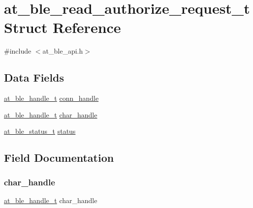 \hypertarget{structat__ble__read__authorize__request__t}{}\section{at\+\_\+ble\+\_\+read\+\_\+authorize\+\_\+request\+\_\+t Struct Reference}
\label{structat__ble__read__authorize__request__t}


{\ttfamily \#include $<$at\+\_\+ble\+\_\+api.\+h$>$}

\subsection*{Data Fields}
\begin{DoxyCompactItemize}
\item 
\mbox{\hyperlink{at__ble__api_8h_abd23646d0c662860741f787efc8456f2}{at\+\_\+ble\+\_\+handle\+\_\+t}} \mbox{\hyperlink{structat__ble__read__authorize__request__t_ae42df6fd8493f8f8faeccfdd6062e96f}{conn\+\_\+handle}}
\item 
\mbox{\hyperlink{at__ble__api_8h_abd23646d0c662860741f787efc8456f2}{at\+\_\+ble\+\_\+handle\+\_\+t}} \mbox{\hyperlink{structat__ble__read__authorize__request__t_abf2dd98b1df5d9471f3e18780eb5e5a7}{char\+\_\+handle}}
\item 
\mbox{\hyperlink{group__error__codes__group_ga3b1db9b95feb157b3c188ca27fe76988}{at\+\_\+ble\+\_\+status\+\_\+t}} \mbox{\hyperlink{structat__ble__read__authorize__request__t_a0b48093fc2030779fc47e5216f8019e2}{status}}
\end{DoxyCompactItemize}


\subsection{Field Documentation}
\mbox{\label{structat__ble__read__authorize__request__t_abf2dd98b1df5d9471f3e18780eb5e5a7}} 
\subsubsection{\texorpdfstring{char\_handle}{char\_handle}}
{\footnotesize\ttfamily \mbox{\hyperlink{at__ble__api_8h_abd23646d0c662860741f787efc8456f2}{at\+\_\+ble\+\_\+handle\+\_\+t}} char\+\_\+handle}

